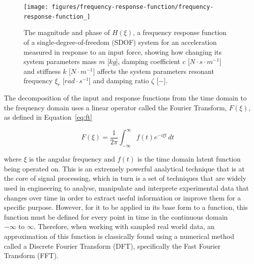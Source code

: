 \documentclass[12pt]{article}
\begin{document}
    \begin{figure}[ht]
        \centering
        \texttt{[image: figures/frequency-response-function/frequency-response-function\_]}
        \caption{The magnitude and phase of $H(\xi)$, a frequency response function of a single-degree-of-freedom (SDOF) system for an acceleration measured in response to an input force, showing how changing its system parameters mass $m$ [$kg$], damping coefficient $c$ [$N \cdot s \cdot m^{-1}$] and stiffness $k$ [$N \cdot m^{-1}$] affects the system parameters resonant frequency $\xi_r$ [$rad \cdot s^{-1}$] and damping ratio $\zeta$ [$-$].}
        \label{fig:frequency-response-function}
    \end{figure}

    The decomposition of the input and response functions from the time domain to the frequency domain uses a linear operator called the Fourier Transform, $F(\xi)$, as defined in Equation~\ref{eq:ft}

    \begin{equation}
        F(\xi) = \frac{1}{2 \pi} \int_{-\infty}^{\infty} f(t) e^{-i \xi t} \, dt\label{eq:ft}
    \end{equation}


    \noindent where $\xi$ is the angular frequency and $f(t)$ is the time domain latent function being operated on.
    This is an extremely powerful analytical technique that is at the core of signal processing, which in turn is a set of techniques that are widely used in engineering to analyse, manipulate and interprete experimental data that changes over time in order to extract useful information or improve them for a specific purpose.
    However, for it to be applied in its base form to a function, this function must be defined for every point in time in the continuous domain $-\infty \text{ to } \infty$.
    Therefore, when working with sampled real world data, an approximation of this function is classically found using a numerical method called a Discrete Fourier Transform (DFT), specifically the Fast Fourier Transform (FFT).
\end{document}
